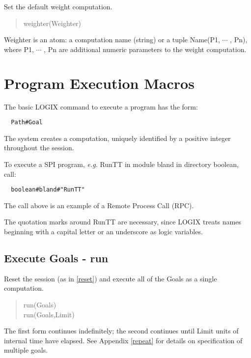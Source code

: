 Set the default weight computation.

\begin{verse}
weighter(Weighter)
\end{verse}

\noindent
Weighter  is an atom: a computation name
(string) or a tuple  Name(P1, $\cdots$ , Pn), where P1, $\cdots$ , Pn
are additional numeric parameters to the weight computation.


\section{Program Execution Macros}
\label{macros}

The basic LOGIX command to execute a program has the form:

\begin{verbatim}
  Path#Goal
\end{verbatim}

\noindent
The system creates a computation, uniquely identified by a positive
integer throughout the session.

\noindent
To execute a SPI program, {\em e.g.} RunTT in module bland in directory
boolean, call:

\begin{verbatim}
  boolean#bland#"RunTT"
\end{verbatim}

\noindent
The call above is an example of a Remote Process Call (RPC).

\noindent
The quotation marks around RunTT are necessary, since LOGIX
treats names beginning with a capital letter or an underscore as logic
variables.

\subsection{Execute Goals - run}
\label{runners}

Reset the session (as in \ref{reset}) and
execute all of the Goals as a single computation.

\begin{verse}
    run(Goals) \\
    run(Goals,Limit)
\end{verse}

\noindent
The first form continues
indefinitely; the second continues until Limit units of internal time have 
elapsed.  See  Appendix \ref{repeat} for details on specification 
of multiple goals.

